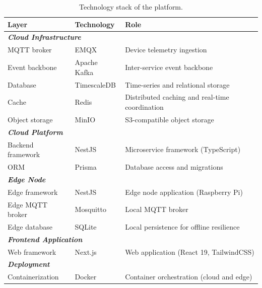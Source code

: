 \begin{table}[htbp]
    \centering
    \caption{Technology stack of the platform.}
    \label{tab:technology-stack}
    \begin{tabular}{l l l}
        \hline
        \textbf{Layer}         & \textbf{Technology} & \textbf{Role}                                  \\
        \hline
        \multicolumn{3}{l}{\textbf{\textit{Cloud Infrastructure}}}                                    \\[2pt]
        \gls{MQTT} broker      & EMQX                & Device telemetry ingestion                     \\
        Event backbone         & Apache Kafka        & Inter-service event backbone                   \\
        Database               & TimescaleDB         & Time-series and relational storage             \\
        Cache                  & Redis               & Distributed caching and real-time coordination \\
        Object storage         & MinIO               & S3-compatible object storage                   \\[4pt]
        \multicolumn{3}{l}{\textbf{\textit{Cloud Platform}}}                                          \\[2pt]
        Backend framework      & NestJS              & Microservice framework (TypeScript)            \\
        \gls{ORM}              & Prisma              & Database access and migrations                 \\[4pt]
        \multicolumn{3}{l}{\textbf{\textit{Edge Node}}}                                               \\[2pt]
        Edge framework         & NestJS              & Edge node application (Raspberry Pi)           \\
        Edge \gls{MQTT} broker & Mosquitto           & Local \gls{MQTT} broker                        \\
        Edge database          & SQLite              & Local persistence for offline resilience       \\[4pt]
        \multicolumn{3}{l}{\textbf{\textit{Frontend Application}}}                                    \\[2pt]
        Web framework          & Next.js             & Web application (React 19, TailwindCSS)        \\[4pt]
        \multicolumn{3}{l}{\textbf{\textit{Deployment}}}                                              \\[2pt]
        Containerization       & Docker              & Container orchestration (cloud and edge)       \\
        \hline
    \end{tabular}
\end{table}

